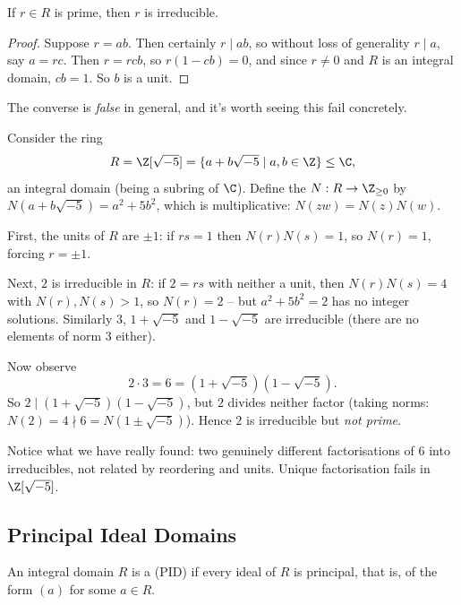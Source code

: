\begin{lemma}
	If $r \in R$ is prime, then $r$ is irreducible.
\end{lemma}
\begin{proof}
	Suppose $r = ab$. Then certainly $r \mid ab$, so without loss of generality $r \mid a$, say $a = rc$. Then $r = rcb$, so $r(1 - cb) = 0$, and since $r \neq 0$ and $R$ is an integral domain, $cb = 1$. So $b$ is a unit.
\end{proof}

The converse is \emph{false} in general, and it's worth seeing this fail concretely.

\begin{example}
	Consider the ring
	$$
	R = \Z[\sqrt{-5}] = \{a + b\sqrt{-5} \mid a, b \in \Z\} \leq \C,
	$$
	an integral domain (being a subring of $\C$). Define the  $N: R \rightarrow \Z_{\geq 0}$ by $N(a + b \sqrt{-5}) = a^2 + 5b^2$, which is multiplicative: $N(zw) = N(z)N(w)$.

	First, the units of $R$ are $\pm 1$: if $rs = 1$ then $N(r)N(s) = 1$, so $N(r) = 1$, forcing $r = \pm 1$.

	Next, $2$ is irreducible in $R$: if $2 = rs$ with neither a unit, then $N(r)N(s) = 4$ with $N(r), N(s) > 1$, so $N(r) = 2$ -- but $a^2 + 5b^2 = 2$ has no integer solutions. Similarly $3$, $1 + \sqrt{-5}$ and $1 - \sqrt{-5}$ are irreducible (there are no elements of norm $3$ either).

	Now observe
	$$
	2 \cdot 3 = 6 = (1 + \sqrt{-5})(1 - \sqrt{-5}).
	$$
	So $2 \mid (1 + \sqrt{-5})(1 - \sqrt{-5})$, but $2$ divides neither factor (taking norms: $N(2) = 4 \nmid 6 = N(1 \pm \sqrt{-5})$). Hence $2$ is irreducible but \emph{not prime}.

	Notice what we have really found: two genuinely different factorisations of $6$ into irreducibles, not related by reordering and units. Unique factorisation fails in $\Z[\sqrt{-5}]$.
\end{example}

\subsection{Principal Ideal Domains}

\begin{definition}
	An integral domain $R$ is a  (PID) if every ideal of $R$ is principal, that is, of the form $(a)$ for some $a \in R$.
\end{definition}

